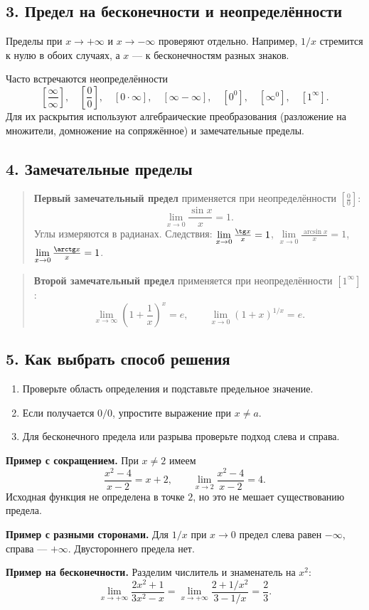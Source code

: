 \clearpage
\subsection*{3. Предел на бесконечности и неопределённости}
Пределы при $x\to+\infty$ и $x\to-\infty$ проверяют отдельно. Например, $1/x$ стремится к нулю в обоих случаях, а $x$ --- к бесконечностям разных знаков.

Часто встречаются неопределённости
\[
  \left[\frac\infty\infty\right],\quad \left[\frac00\right],\quad [0\cdot\infty],\quad [\infty-\infty],\quad [0^0],\quad [\infty^0],\quad [1^\infty].
\]
Для их раскрытия используют алгебраические преобразования (разложение на множители, домножение на сопряжённое) и замечательные пределы.

\subsection*{4. Замечательные пределы}
\begin{quote}
\textbf{Первый замечательный предел} применяется при неопределённости $\left[\frac00\right]$:
\[
  \lim\limits_{x\to0}\frac{\sin x}{x}=1.
\]
Углы измеряются в радианах. Следствия: $\lim\limits_{x\to0}\frac{\tg x}{x}=1$, $\lim\limits_{x\to0}\frac{\arcsin x}{x}=1$, $\lim\limits_{x\to0}\frac{\arctg x}{x}=1$.
\end{quote}

\begin{quote}
\textbf{Второй замечательный предел} применяется при неопределённости $[1^\infty]$:
\[
  \lim\limits_{x\to\infty}\left(1+\frac1x\right)^x=e,
  \qquad
  \lim\limits_{x\to0}(1+x)^{1/x}=e.
\]
\end{quote}

\subsection*{5. Как выбрать способ решения}
\begin{enumerate}
  \item Проверьте область определения и подставьте предельное значение.
  \item Если получается $0/0$, упростите выражение при $x\ne a$.
  \item Для бесконечного предела или разрыва проверьте подход слева и справа.
\end{enumerate}
\textbf{Пример с сокращением.} При $x\ne2$ имеем
\[
  \frac{x^2-4}{x-2}=x+2,\qquad
  \lim_{x\to2}\frac{x^2-4}{x-2}=4.
\]
Исходная функция не определена в точке $2$, но это не мешает существованию предела.

\textbf{Пример с разными сторонами.} Для $1/x$ при $x\to0$ предел слева равен $-\infty$, справа --- $+\infty$. Двустороннего предела нет.

\textbf{Пример на бесконечности.} Разделим числитель и знаменатель на $x^2$:
\[
  \lim_{x\to+\infty}\frac{2x^2+1}{3x^2-x}
  =\lim_{x\to+\infty}\frac{2+1/x^2}{3-1/x}=\frac23.
\]
